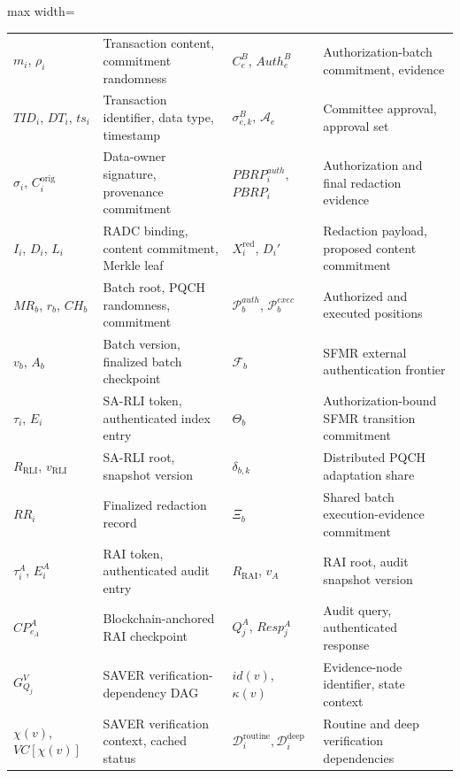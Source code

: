 \documentclass[lettersize,journal]{IEEEtran}
\begin{document}
\begin{table}[t]
\begin{adjustbox}{max width=\textwidth}
\begin{tabular}{@{}ll@{\quad}ll@{}}
$m_i$, $\rho_i$
& Transaction content, commitment randomness &
$C_e^B$, $Auth_e^B$
& Authorization-batch commitment, evidence\\

$TID_i$, $DT_i$, $ts_i$
& Transaction identifier, data type, timestamp &
$\sigma_{e,k}^B$, $\mathcal{A}_e$
& Committee approval, approval set\\

$\sigma_i$, $C_i^{\mathrm{orig}}$
& Data-owner signature, provenance commitment &
$PBRP_i^{auth}$, $PBRP_i$
& Authorization and final redaction evidence\\

$I_i$, $D_i$, $L_i$
& RADC binding, content commitment, Merkle leaf &
$X_i^{\mathrm{red}}$, $D_i'$
& Redaction payload, proposed content commitment\\

$MR_b$, $r_b$, $CH_b$
& Batch root, PQCH randomness, commitment &
$\mathcal{P}_b^{auth}$, $\mathcal{P}_b^{exec}$
& Authorized and executed positions\\

$v_b$, $A_b$
& Batch version, finalized batch checkpoint &
$\mathcal{F}_b$
& SFMR external authentication frontier\\

$\tau_i$, $E_i$
& SA-RLI token, authenticated index entry &
$\Theta_b$
& Authorization-bound SFMR transition commitment\\

$R_{\mathrm{RLI}}$, $v_{\mathrm{RLI}}$
& SA-RLI root, snapshot version &
$\delta_{b,k}$
& Distributed PQCH adaptation share\\

$RR_i$
& Finalized redaction record &
$\Xi_b$
& Shared batch execution-evidence commitment\\

$\tau_i^A$, $E_i^A$
& RAI token, authenticated audit entry &
$R_{\mathrm{RAI}}$, $v_A$
& RAI root, audit snapshot version\\

$CP_{e_A}^A$
& Blockchain-anchored RAI checkpoint &
$Q_j^A$, $Resp_j^A$
& Audit query, authenticated response\\

$G_{Q_j}^{V}$
& SAVER verification-dependency DAG &
$id(v)$, $\kappa(v)$
& Evidence-node identifier, state context\\

$\chi(v)$, $VC[\chi(v)]$
& SAVER verification context, cached status &
$\mathcal{D}_i^{\mathrm{routine}},
 \mathcal{D}_i^{\mathrm{deep}}$
& Routine and deep verification dependencies\\


\end{tabular}
\end{adjustbox}
\end{table}
\end{document}
